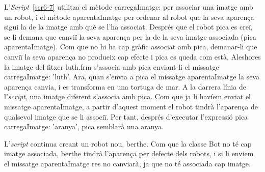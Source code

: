 L'\emph{Script}~\ref{scr6-7} utilitza el mètode \textsf{carregaImatge:} per associar una imatge amb un robot, i el mètode \textsf{aparentaImatge} per ordenar al robot que la seva aparença sigui la de la imatge amb què se l'ha associat. Després que el robot \textsf{pica} es creï, se li demana que canviï la seva aparença per la de la seva imatge associada (\textsf{pica aparentaImatge}). Com que no hi ha cap gràfic associat amb \textsf{pica}, demanar-li que canviï la seva aparença no produeix cap efecte i \textsf{pica} es queda com està. Aleshores la imatge del fitxer \textsf{luth.frm} s'associa amb \textsf{pica} enviant-li el missatge \textsf{carregaImatge: 'luth'}. Ara, quan s'envia a \textsf{pica} el missatge \textsf{aparentaImatge} la seva aparença canvia, i es transforma en una tortuga de mar. A la darrera línia de l'\emph{script}, una imatge diferent s'associa amb \textsf{pica}. Com que ja li havíem enviat el missatge \textsf{aparentaImatge}, a partir d'aquest moment el robot tindrà l'aparença de qualsevol imatge que se li associï. Per tant, després d'executar l'expressió \textsf{pica carregaImatge: 'aranya'}, \textsf{pica} semblarà una aranya.  

L'\emph{script} continua creant un robot nou, \textsf{berthe}. Com que la classe \textsf{Bot} no té cap imatge associada, \textsf{berthe} tindrà l'aparença per defecte dels robots, i si li enviem el missatge \textsf{aparentaImatge} res no canviarà, ja que no té associada cap imatge. 

